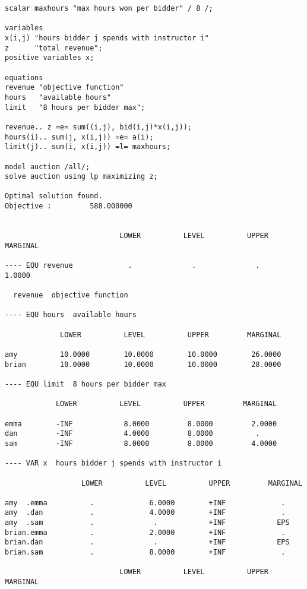 \begin{enumerate}
\begin{solution}
\begin{Verbatim}
scalar maxhours "max hours won per bidder" / 8 /;

variables
x(i,j) "hours bidder j spends with instructor i"
z      "total revenue";
positive variables x;

equations
revenue "objective function"
hours   "available hours"
limit   "8 hours per bidder max";

revenue.. z =e= sum((i,j), bid(i,j)*x(i,j));
hours(i).. sum(j, x(i,j)) =e= a(i);
limit(j).. sum(i, x(i,j)) =l= maxhours;

model auction /all/;
solve auction using lp maximizing z;

Optimal solution found.
Objective :         588.000000


                           LOWER          LEVEL          UPPER         MARGINAL

---- EQU revenue             .              .              .             1.0000      

  revenue  objective function

---- EQU hours  available hours

             LOWER          LEVEL          UPPER         MARGINAL

amy          10.0000        10.0000        10.0000        26.0000      
brian        10.0000        10.0000        10.0000        28.0000      

---- EQU limit  8 hours per bidder max

            LOWER          LEVEL          UPPER         MARGINAL

emma        -INF            8.0000         8.0000         2.0000      
dan         -INF            4.0000         8.0000          .          
sam         -INF            8.0000         8.0000         4.0000      

---- VAR x  hours bidder j spends with instructor i

                  LOWER          LEVEL          UPPER         MARGINAL

amy  .emma          .             6.0000        +INF             .          
amy  .dan           .             4.0000        +INF             .          
amy  .sam           .              .            +INF            EPS         
brian.emma          .             2.0000        +INF             .          
brian.dan           .              .            +INF            EPS         
brian.sam           .             8.0000        +INF             .          

                           LOWER          LEVEL          UPPER         MARGINAL


\end{Verbatim}
\end{solution}
\end{enumerate}
